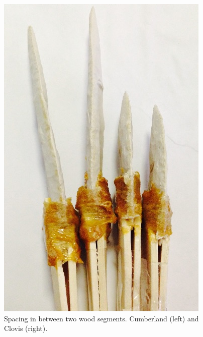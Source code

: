 \begin{figure}[!p]
	\centering
	\includegraphics[width=\linewidth]{figures/gagglioli_Fig7}
	\caption{Spacing in between two wood segments. Cumberland (left) and Clovis (right).}
	\label{fig:gagglioli_Fig7}
\end{figure}
\clearpage
\printbibliography[heading=subbibnumbered] 
\label{Gaggioli:lastpage}
\closingarticle